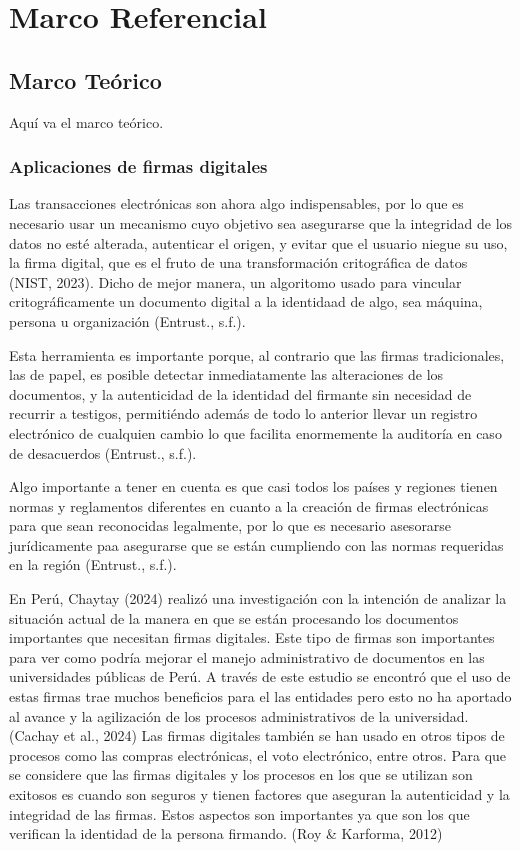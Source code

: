 \documentclass[a4paper,12pt]{report}
\begin{document}
\chapter{Marco Referencial}
\section{Marco Teórico}
Aquí va el marco teórico.
\subsection{Aplicaciones de firmas digitales}

Las transacciones electrónicas son ahora algo indispensables, por lo que es necesario usar un mecanismo cuyo objetivo sea asegurarse que la integridad de los datos no esté alterada, autenticar el origen, y evitar que el usuario niegue su uso, la firma digital, que es el fruto de una transformación critográfica de datos (NIST, 2023). Dicho de mejor manera, un algoritomo usado para vincular critográficamente un documento digital a la identidaad de algo, sea máquina, persona u organización (Entrust., s.f.).  

Esta herramienta es importante porque, al contrario que las firmas tradicionales, las de papel, es posible detectar inmediatamente las alteraciones de los documentos, y  la autenticidad de la identidad del firmante sin necesidad de recurrir a testigos, permitiéndo además de todo lo anterior llevar un registro electrónico de cualquien cambio lo que facilita enormemente la auditoría en caso de desacuerdos (Entrust., s.f.).

Algo importante a tener en cuenta es que casi todos los países y regiones tienen normas y reglamentos diferentes en cuanto a la creación de firmas electrónicas para que sean reconocidas legalmente, por lo que es necesario asesorarse jurídicamente paa asegurarse que se están cumpliendo con las normas requeridas en la región (Entrust., s.f.).

En Perú, Chaytay (2024) realizó una investigación con la intención de analizar la situación actual de la manera en que se están procesando los documentos importantes que necesitan firmas digitales. Este tipo de firmas son importantes para ver como podría mejorar el manejo administrativo de documentos en las universidades públicas de Perú. A través de este estudio se encontró que el uso de estas firmas trae muchos beneficios para el las entidades pero esto no ha aportado al avance y la agilización de los procesos administrativos de la universidad. (Cachay et al., 2024) Las firmas digitales también se han usado en otros tipos de procesos como las compras electrónicas, el voto electrónico, entre otros. Para que se considere que las firmas digitales y los procesos en los que se utilizan son exitosos es cuando son seguros y tienen factores que aseguran la autenticidad y la integridad de las firmas. Estos aspectos son importantes ya que son los que verifican la identidad de la persona firmando. (Roy & Karforma, 2012)
\end{document}
